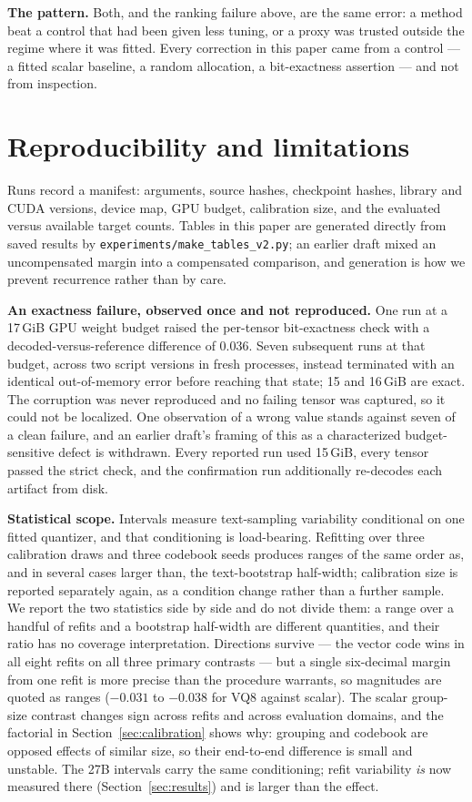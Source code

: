 \documentclass[11pt]{article}
\begin{document}
\textbf{The pattern.} Both, and the ranking failure above, are the same error:
a method beat a control that had been given less tuning, or a proxy was trusted
outside the regime where it was fitted. Every correction in this paper came from
a control --- a fitted scalar baseline, a random allocation, a bit-exactness
assertion --- and not from inspection.

\section{Reproducibility and limitations}

Runs record a manifest: arguments, source hashes, checkpoint hashes, library and
CUDA versions, device map, GPU budget, calibration size, and the evaluated
versus available target counts. Tables in this paper are generated directly from
saved results by \texttt{experiments/make\_tables\_v2.py}; an earlier draft
mixed an uncompensated margin into a compensated comparison, and generation is
how we prevent recurrence rather than by care.

\textbf{An exactness failure, observed once and not reproduced.} One run at a
17\,GiB GPU weight budget raised the per-tensor bit-exactness check with a
decoded-versus-reference difference of $0.036$. Seven subsequent runs at that
budget, across two script versions in fresh processes, instead terminated with
an identical out-of-memory error before reaching that state; 15 and 16\,GiB are
exact. The corruption was never reproduced and no failing tensor was captured,
so it could not be localized. One observation of a wrong value stands against
seven of a clean failure, and an earlier draft's framing of this as a
characterized budget-sensitive defect is withdrawn. Every reported run used
15\,GiB, every tensor passed the strict check, and the confirmation run
additionally re-decodes each artifact from disk.

\textbf{Statistical scope.} Intervals measure text-sampling variability
conditional on one fitted quantizer, and that conditioning is load-bearing.
Refitting over three calibration draws and three codebook seeds produces
ranges of the same order as, and in several cases larger than, the
text-bootstrap half-width; calibration size is reported separately again, as a
condition change rather than a further sample. We report the two statistics
side by side and do not divide them: a range over a handful of refits and a
bootstrap half-width are different quantities, and their ratio has no coverage
interpretation. Directions survive --- the vector code wins in all eight refits
on all three primary contrasts --- but a single six-decimal margin from one
refit is more precise than the procedure warrants, so magnitudes are quoted as
ranges ($-0.031$ to $-0.038$ for VQ8 against scalar). The scalar group-size
contrast changes sign across refits and across evaluation domains, and the
factorial in Section~\ref{sec:calibration} shows why: grouping and codebook are
opposed effects of similar size, so their end-to-end difference is small and
unstable. The 27B intervals carry the same conditioning; refit variability
\emph{is} now measured there (Section~\ref{sec:results}) and is larger than the
effect.
\end{document}

